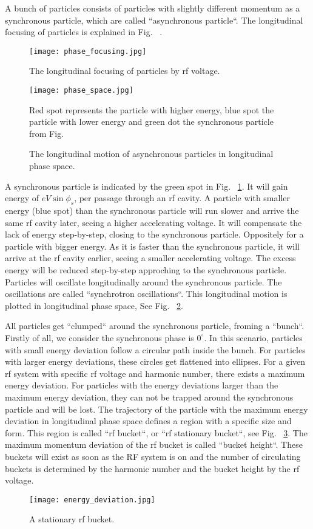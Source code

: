A bunch of particles consists of particles with slightly different momentum as a synchronous particle, which are called ``asynchronous particle``. The longitudinal focusing of particles is explained in Fig. ~\label{phase_focusing}. 
\begin{figure}[!htb]
   \centering   
   \texttt{[image: phase\_focusing.jpg]}
   \caption{The longitudinal focusing of particles by rf voltage.}
   \label{phase_focusing}
\end{figure}
\begin{figure}[!htb]
   \centering   
   \texttt{[image: phase\_space.jpg]}
   \caption{The longitudinal motion of asynchronous particles in longitudinal phase space.}{Red spot represents the particle with higher energy, blue spot the particle with lower energy and green dot the synchronous particle from Fig. ~\label{phase_focusing}}
   \label{phase_space}
\end{figure}
A synchronous particle is indicated by the green spot in Fig. ~\ref{phase_focusing}. It will gain energy of $eV\sin\phi_{\mathit{s}}$, per passage through an rf cavity. A particle with smaller energy (blue spot) than the synchronous particle will run slower and arrive the same rf cavity later, seeing a higher accelerating voltage. It will compensate the lack of energy step-by-step, closing to the synchronous particle. Oppositely for a particle with bigger energy. As it is faster than the synchronous particle, it will arrive at the rf cavity earlier, seeing a smaller accelerating voltage. The excess energy will be reduced step-by-step approching to the synchronous particle. Particles will oscillate longitudinally around the synchronous particle. The oscillations are called ``synchrotron oscillations``. This longitudinal motion is plotted in longitudinal phase space, See Fig. ~\ref{phase_space}.

All particles get ``clumped`` around the synchronous particle, froming a ``bunch``. Firstly of all, we consider the synchronous phase is $0^\circ$. In this scenario, particles with small energy deviation follow a circular path inside the bunch. For particles with larger energy deviations, these circles get flattened into ellipses. For a given rf system with specific rf voltage and harmonic number, there exists a maximum energy deviation. For particles with the energy deviations larger than the maximum energy deviation, they can not be trapped around the synchronous particle and will be lost. The trajectory of the particle with the maximum energy deviation in longitudinal phase space defines a region with a specific size and form. This region is called ``rf bucket``, or ``rf stationary bucket``, see Fig. ~\ref{energy_deviation}. The maximum momentum deviation of the rf bucket is called ``bucket height``. These buckets will exist as soon as the RF system is on and the number of  circulating buckets is determined by the harmonic number and the bucket height by the rf voltage. 
\begin{figure}[!htb]
   \centering   
   \texttt{[image: energy\_deviation.jpg]}
   \caption{A stationary rf bucket.}
   \label{energy_deviation}
\end{figure} 

